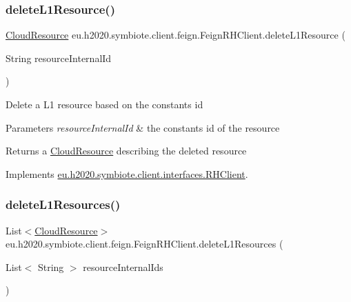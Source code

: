 \subsubsection{\texorpdfstring{delete\+L1\+Resource()}{deleteL1Resource()}}
{\footnotesize\ttfamily \hyperlink{classeu_1_1h2020_1_1symbiote_1_1cloud_1_1model_1_1internal_1_1CloudResource}{Cloud\+Resource} eu.\+h2020.\+symbiote.\+client.\+feign.\+Feign\+R\+H\+Client.\+delete\+L1\+Resource (\begin{DoxyParamCaption}\item[{String}]{resource\+Internal\+Id }\end{DoxyParamCaption})}

Delete a L1 resource based on the constants id


\begin{DoxyParams}{Parameters}
{\em resource\+Internal\+Id} & the constants id of the resource \\
\hline
\end{DoxyParams}
\begin{DoxyReturn}{Returns}
a \hyperlink{}{Cloud\+Resource} describing the deleted resource 
\end{DoxyReturn}


Implements \hyperlink{interfaceeu_1_1h2020_1_1symbiote_1_1client_1_1interfaces_1_1RHClient_a9ed4582f57457a4dd4fe2bf77a6822fc}{eu.\+h2020.\+symbiote.\+client.\+interfaces.\+R\+H\+Client}.

\mbox{\label{classeu_1_1h2020_1_1symbiote_1_1client_1_1feign_1_1FeignRHClient_ae56343520532a4d10423bfa99d49787f}} 
\subsubsection{\texorpdfstring{delete\+L1\+Resources()}{deleteL1Resources()}}
{\footnotesize\ttfamily List$<$\hyperlink{classeu_1_1h2020_1_1symbiote_1_1cloud_1_1model_1_1internal_1_1CloudResource}{Cloud\+Resource}$>$ eu.\+h2020.\+symbiote.\+client.\+feign.\+Feign\+R\+H\+Client.\+delete\+L1\+Resources (\begin{DoxyParamCaption}\item[{List$<$ String $>$}]{resource\+Internal\+Ids }\end{DoxyParamCaption})}

